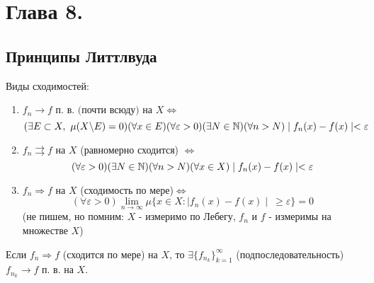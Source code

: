\setcounter{section}{7}
\section{Глава 8.}
\setcounter{subsection}{6}
\subsection{Принципы Литтлвуда}
Виды сходимостей:
\begin{enumerate}
    \item $f_n \rightarrow f \text{ п. в. (почти всюду) на } X \Leftrightarrow$ $$(\exists E\subset X,\  \mu (X\backslash E)=0)(\forall x \in E)(\forall \varepsilon > 0)(\exists N \in \N)(\forall n>N) \mid f_n(x)-f(x)\mid<\varepsilon$$
    \item $f_n \rightrightarrows f$ на $X$ (равномерно сходится) $\Leftrightarrow$ 
    $$(\forall \varepsilon > 0)(\exists N \in \N)(\forall n>N)(\forall x \in X) \mid f_n(x)-f(x)\mid<\varepsilon$$
    \item $f_n \Rightarrow f$ на $X$ (сходимость по мере)$\Leftrightarrow$
    $$(\forall \varepsilon > 0) \lim_{n\to\infty} \mu \{ x\in X: \mid f_n(x)-f(x)\mid \ \geqslant \varepsilon \} =0$$
    (не пишем, но помним: $X$ - измеримо по Лебегу, $f_n$ и $f$ - измеримы на множестве $X$)
\end{enumerate}
\begin{theorem}[Ф. Рисса]
    Если $f_n \Rightarrow f$ (сходится по мере) на $X$, то $\exists \{f_{n_k} \} ^\infty_{k=1}$ (подпоследовательность) $f_{n_k} \rightarrow f$ п. в. на $X$.
\end{theorem}

